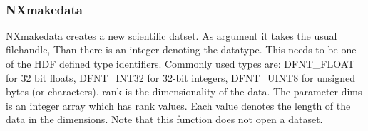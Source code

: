 \documentclass[12pt]{article}
\begin{document}
\begin{flushleft}
\begin{minipage}{\linewidth}
\begin{list}{}{}
\mbox{}\verb@            pFile->iCurrentVG = Vattach(pFile->iVID,@\\
\mbox{}\verb@                                        pFile->iStack[pFile->iStackPtr],@\\
\mbox{}\verb@                                        "w");@\\
\mbox{}\verb@         }@\\
\mbox{}\verb@      }@\\
\mbox{}\verb@      NXIKillDir(pFile);@\\
\mbox{}\verb@      return NX_OK;@\\
\mbox{}\verb@   }@\\
\end{list}
\vspace{-1ex}
\footnotesize\addtolength{\baselineskip}{-1ex}
\end{minipage}\\[4ex]
\end{flushleft}
\subsubsection{NXmakedata}
NXmakedata creates a new scientific datset. As argument it takes the usual filehandle,
Than there is an integer denoting the datatype. This needs to be one of the
HDF defined type identifiers. Commonly used types are: DFNT\_FLOAT for 32 bit
floats, DFNT\_INT32 for 32-bit integers, DFNT\_UINT8 for unsigned bytes (or
characters). rank is the dimensionality of the data. The parameter dims is
an integer array which has rank values. Each value denotes the length of the
data in the dimensions. Note that this function does not open a dataset.
\end{document}
